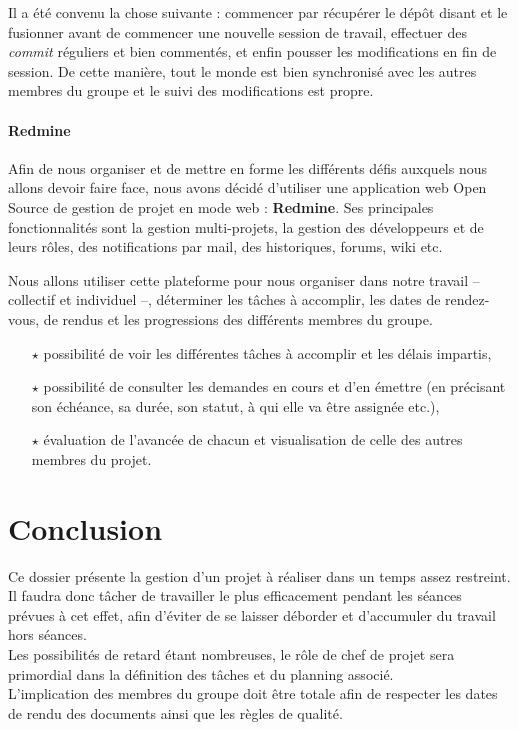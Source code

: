 Il a été convenu la chose suivante : commencer par récupérer le dépôt disant et le fusionner avant de commencer une nouvelle session de travail, effectuer des \textit{commit} réguliers et bien commentés, et enfin pousser les modifications en fin de session. De cette manière, tout le monde est bien synchronisé avec les autres membres du groupe et le suivi des modifications est propre.

\paragraph*{Redmine\\}
Afin de nous organiser et de mettre en forme les différents défis auxquels nous allons devoir faire face, nous avons décidé d'utiliser une application web Open Source de gestion de projet en mode web : \textbf{Redmine}. Ses principales fonctionnalités sont la gestion multi-projets, la gestion des développeurs et de leurs rôles, des notifications par mail, des historiques, forums, wiki etc.

Nous allons utiliser cette plateforme pour nous organiser dans notre travail -- collectif et individuel --, déterminer les tâches à accomplir, les dates de rendez-vous, de rendus et les progressions des différents membres du groupe.

\begin{itemize}
  \item[$\star$] possibilité de voir les différentes tâches à accomplir et les délais impartis,
  \item[$\star$] possibilité de consulter les demandes en cours et d'en émettre (en précisant son échéance, sa durée, son statut, à qui elle va être assignée etc.),
  \item[$\star$] évaluation de l'avancée de chacun et visualisation de celle des autres membres du projet.
\end{itemize}


\section{Conclusion}
Ce dossier présente la gestion d'un projet à réaliser dans un temps assez restreint. Il faudra donc tâcher de travailler le plus efficacement pendant les séances prévues à cet effet, afin d'éviter de se laisser déborder et d'accumuler du travail hors séances.\\
Les possibilités de retard étant nombreuses, le rôle de chef de projet sera primordial dans la définition des tâches et du planning associé.\\
L'implication des membres du groupe doit être totale afin de respecter les dates de rendu des documents ainsi que les règles de qualité.

